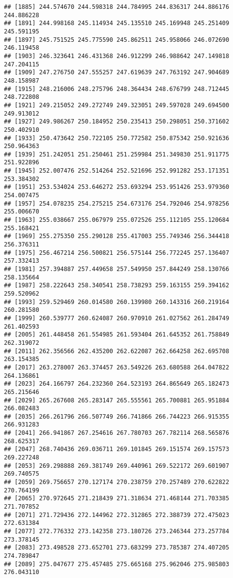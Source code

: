 \documentclass[]{article}
\begin{document}
\begin{verbatim}
## [1885] 244.574670 244.598318 244.784995 244.836317 244.886176 244.886228
## [1891] 244.998168 245.114934 245.135510 245.169948 245.251409 245.591195
## [1897] 245.751525 245.775590 245.862511 245.958066 246.072690 246.119458
## [1903] 246.323641 246.431368 246.912299 246.988642 247.149818 247.204115
## [1909] 247.276750 247.555257 247.619639 247.763192 247.904689 248.158987
## [1915] 248.216006 248.275796 248.364434 248.676799 248.712445 248.722808
## [1921] 249.215052 249.272749 249.323051 249.597028 249.694500 249.913012
## [1927] 249.986267 250.184952 250.235413 250.298051 250.371602 250.402910
## [1933] 250.473642 250.722105 250.772582 250.875342 250.921636 250.964363
## [1939] 251.242051 251.250461 251.259984 251.349830 251.911775 251.922896
## [1945] 252.007476 252.514264 252.521696 252.991282 253.171351 253.384302
## [1951] 253.534024 253.646272 253.693294 253.951426 253.979360 254.007475
## [1957] 254.078235 254.275215 254.673176 254.792046 254.978256 255.006670
## [1963] 255.038667 255.067979 255.072526 255.112105 255.120684 255.168421
## [1969] 255.275350 255.290128 255.417003 255.749346 256.344418 256.376311
## [1975] 256.467214 256.500821 256.575144 256.772245 257.136407 257.332413
## [1981] 257.394887 257.449658 257.549950 257.844249 258.130766 258.135664
## [1987] 258.222643 258.340541 258.738293 259.163155 259.394162 259.520962
## [1993] 259.529469 260.014580 260.139980 260.143316 260.219164 260.281580
## [1999] 260.539777 260.624087 260.970910 261.027562 261.284749 261.402593
## [2005] 261.448458 261.554985 261.593404 261.645352 261.758849 262.319072
## [2011] 262.356566 262.435200 262.622087 262.664258 262.695708 263.154385
## [2017] 263.278007 263.374457 263.549226 263.680588 264.047822 264.136861
## [2023] 264.166797 264.232360 264.523193 264.865649 265.182473 265.215646
## [2029] 265.267608 265.283147 265.555561 265.700881 265.951884 266.082483
## [2035] 266.261796 266.507749 266.741866 266.744223 266.915355 266.931283
## [2041] 266.941867 267.254616 267.780703 267.782114 268.565876 268.625317
## [2047] 268.740436 269.036711 269.101845 269.151574 269.157573 269.227248
## [2053] 269.298888 269.381749 269.440961 269.522172 269.601907 269.740575
## [2059] 269.756657 270.127174 270.238759 270.257489 270.622822 270.764199
## [2065] 270.972645 271.218439 271.318634 271.468144 271.703385 271.707852
## [2071] 271.729436 272.144962 272.312865 272.388739 272.475023 272.631384
## [2077] 272.776332 273.142358 273.180726 273.246344 273.257784 273.378145
## [2083] 273.498528 273.652701 273.683299 273.785387 274.407205 274.789847
## [2089] 275.047677 275.457485 275.665168 275.962046 275.985803 276.043110

\end{verbatim}
\end{document}
